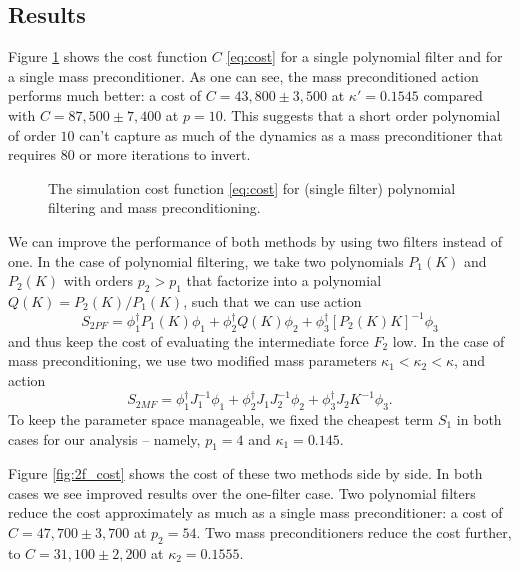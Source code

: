 \subsection{Results}
Figure \ref{fig:1f_cost} shows the cost function $C$ \eqref{eq:cost} for a single polynomial filter and for a single mass preconditioner.
As one can see, the mass preconditioned action performs much better: a cost of $C = 43,800 \pm 3,500$ at $\kappa' = 0.1545$ compared with $C = 87,500 \pm 7,400$ at $p = 10$.
This suggests that a short order polynomial of order $10$ can't capture as much of the dynamics as a mass preconditioner that requires $80$ or more iterations to invert.

\begin{figure}
\centering

\caption{The simulation cost function \eqref{eq:cost} for (single filter) polynomial filtering and mass preconditioning.} \label{fig:1f_cost}
\end{figure}

We can improve the performance of both methods by using two filters instead of one. In the case of polynomial filtering, we take two polynomials $P_1(K)$ and $P_2(K)$ with orders $p_2 > p_1$ that factorize into a polynomial $Q(K) = P_2(K)/P_1(K)$, such that we can use action
\begin{equation}
	S_{2PF} = \phi_1^\dag P_1(K) \phi_1 + \phi_2^\dag Q(K) \phi_2  + \phi_3^\dag [P_2(K)K]^{-1} \phi_3 
\end{equation}
and thus keep the cost of evaluating the intermediate force $F_2$ low.
In the case of mass preconditioning, we use two modified mass parameters $\kappa_1 < \kappa_2 < \kappa$, and action
\begin{equation}
	S_{2MF} = \phi_1^\dag J_1^{-1} \phi_1 + \phi_2^\dag J_1 J_2^{-1} \phi_2  + \phi_3^\dag J_2 K^{-1} \phi_3.
\end{equation}
To keep the parameter space manageable, we fixed the cheapest term $S_1$ in both cases for our analysis -- namely, $p_1 = 4$ and $\kappa_1 = 0.145$.

Figure \ref{fig:2f_cost} shows the cost of these two methods side by side.
In both cases we see improved results over the one-filter case. 
Two polynomial filters reduce the cost approximately as much as a single mass preconditioner: a cost of $C = 47,700 \pm 3,700$ at $p_2 = 54$.
Two mass preconditioners reduce the cost further, to $C = 31,100 \pm 2,200$ at $\kappa_2 = 0.1555$.

